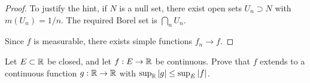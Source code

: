 \documentclass{article}
\begin{document}
\begin{proof}
To justify the hint, if $N$ is a null set, there exist open sets $U_n \supset N$ with $m(U_n) = 1/n$. The required Borel set is $\bigcap_n U_n$.

Since $f$ is measurable, there exists simple functions $f_n \to f$.

\begin{comment}
Let $(A_n)$ be a countable base for $\R$ such that $\sup_n \diam(A_n) < 1/2$. Since $f$ is measurable, for each $n$, there exist a Borel set $B_n$ and a null set $\widetilde{N_n}$ disjoint from $B_n$ such that $f^{-1}(A_n) = B_n \cup \widetilde{N_n}$. By the hint, then, $f^{-1}(A_n) \subset B_n \cup N_n$ for some null Borel set $N_n$. Let $N := \bigcup_n N_n$.

Let $g := \chi_{N^c} f$. Let $d:\R \to \R^2$ is the diagonal map, and $\mu:\R^2 \to R$ be the multiplication map. Then $g = \mu \circ (f, \chi_{N^c}) \circ d$. Note that $(A_n \times A_m)_{n,m}$ is a countable base for $\R^2$. 

Let $U \subset \R$ be open.  Since $\mu$ is continuous, $\mu^{-1} (U)$ is open so can be written as $\mu^{-1} (U) = \bigcup_{(n,m) \in C} A_n \times A_m$ for some countable set $C$.  Note that for each $n,m$, we have $(f, \chi_{N^c})^{-1}(A_n \times A_m) = f^{-1}(A_n) \times \chi_{N^c}^{-1} (A_m) = (B_n \cup N_n) \times (\emptyset \text{ or } N^c \text{ or } N)$, where the last equality follows from the fact that $\diam(A_m) < 1/2$ (so $\chi_{N^c}^{-1} (A_m) \ne \R$).  Applying $d^{-1}$ is just taking the intersection, so $d^{-1}((f, \chi_{N^c})^{-1}(A_n \times A_m)) = (B_n \cup N_n) \cap (\emptyset \text{ or } N^c \text{ or } N)$
\end{comment}


\end{proof}
 Let $E \subset \mathbb{R}$ be closed, and let $f:E\to \mathbb{R}$ be continuous. Prove that $f$ extends to a continuous function $g:\mathbb{R}\to\mathbb{R}$ with $\sup_{\mathbb{R}} |g| \le \sup_E |f|$.
\end{document}
